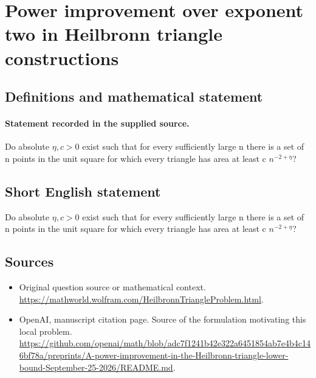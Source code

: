 \documentclass[11pt]{article}
\begin{document}
\section*{Power improvement over exponent two in Heilbronn triangle constructions}\label{30007092}
\subsection{Definitions and mathematical statement}
\paragraph{Statement recorded in the supplied source.}
Do absolute $\eta ,c>0$ exist such that for every sufficiently large n there is a set of n points in the unit square for which every triangle has area at least c $n^{-2+\eta }$?
\subsection{Short English statement}
Do absolute $\eta ,c>0$ exist such that for every sufficiently large n there is a set of n points in the unit square for which every triangle has area at least c $n^{-2+\eta }$?
\subsection{Sources}
\begin{itemize}
\item[S1] Original question source or mathematical context.
\url{https://mathworld.wolfram.com/HeilbronnTriangleProblem.html}.
\item[S2] OpenAI, manuscript citation page. Source of the formulation motivating this local problem.
\url{https://github.com/openai/math/blob/adc7f1241b42e322a6451854ab7e4b4c146bf78a/preprints/A-power-improvement-in-the-Heilbronn-triangle-lower-bound-September-25-2026/README.md}.
\end{itemize}
\end{document}
